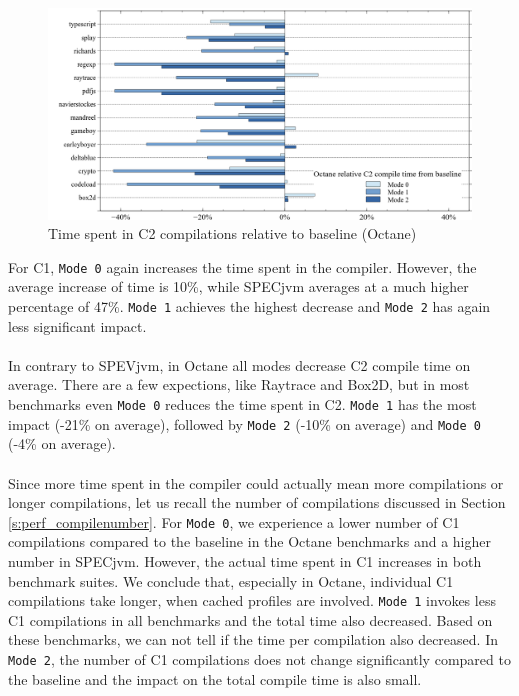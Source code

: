 \begin{figure}[ht]
  \begin{center}
    \centering
    \includegraphics[width=1.0\textwidth]{figures/octane_variation_compiletime_c2.png}
    \caption{Time spent in C2 compilations relative to baseline (Octane)}
    \label{f:octane_variation_compiletime_c2}
  \end{center}
\end{figure}
For C1, \texttt{Mode 0} again increases the time spent in the compiler. However, the average increase of time is 10\%, while SPECjvm averages at a much higher percentage of 47\%.
\texttt{Mode 1} achieves the highest decrease and \texttt{Mode 2} has again less significant impact.
\\\\
In contrary to SPEVjvm, in Octane all modes decrease C2 compile time on average. There are a few expections, like Raytrace and Box2D, but in most benchmarks even \texttt{Mode 0} reduces the time spent in C2. \texttt{Mode 1} has the most impact (-21\% on average), followed by \texttt{Mode 2} (-10\% on average) and \texttt{Mode 0} (-4\% on average).
\\\\
Since more time spent in the compiler could actually mean more compilations or longer compilations, let us recall the number of compilations discussed in Section \ref{s:perf_compilenumber}. For \texttt{Mode 0}, we experience a lower number of C1 compilations compared to the baseline in the Octane benchmarks and a higher number in SPECjvm. However, the actual time spent in C1 increases in both benchmark suites. We conclude that, especially in Octane, individual C1 compilations take longer, when cached profiles are involved. \texttt{Mode 1} invokes less C1 compilations in all benchmarks and the total time also decreased. Based on these benchmarks, we can not tell if the time per compilation also decreased. In \texttt{Mode 2}, the number of C1 compilations does not change significantly compared to the baseline and the impact on the total compile time is also small.
